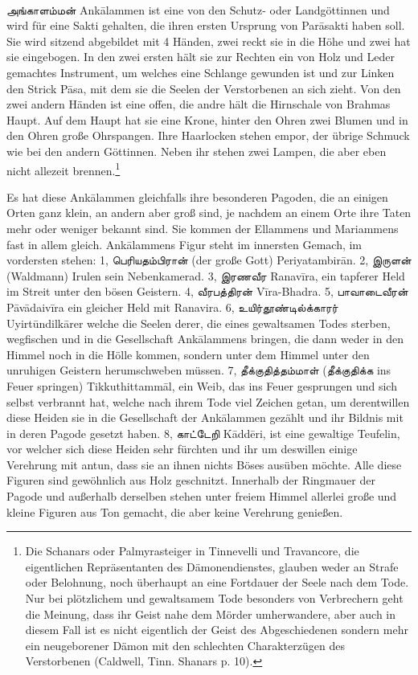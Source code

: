 \documentclass{article}
\newcommand{\TamilText}[1]{\texttamil{#1}}
\newcommand{\tam}[1]{\TamilText{#1}}
\begin{document}
\paragraph{}
\tam{அங்காளம்மன்} Ank\={a}lammen ist eine von den Schutz- oder Landgöttinnen und wird für eine Sakti gehalten, die ihren ersten Ursprung von Par\={a}sakti haben soll. Sie wird sitzend abgebildet mit 4 Händen, zwei reckt sie in die Höhe und zwei hat sie eingebogen. In den zwei ersten hält sie zur Rechten ein von Holz und Leder gemachtes Instrument, um welches eine Schlange gewunden ist und zur Linken den Strick P\={a}sa, mit dem sie die Seelen der Verstorbenen an sich zieht. Von den zwei andern Händen ist eine offen, die andre hält die Hirnschale von Brahmas Haupt. Auf dem Haupt hat sie eine Krone, hinter den Ohren zwei Blumen und in den Ohren große Ohrspangen. Ihre Haarlocken stehen empor, der übrige Schmuck wie bei den andern Göttinnen. Neben ihr stehen zwei Lampen, die aber eben nicht allezeit brennen.\footnote{Die Schanars oder Palmyrasteiger in Tinnevelli und Travancore, die eigentlichen Repräsentanten des Dämonendienstes, glauben weder an Strafe oder Belohnung, noch überhaupt an eine Fortdauer der Seele nach dem Tode. Nur bei plötzlichem und gewaltsamem Tode besonders von Verbrechern geht die Meinung, dass ihr Geist nahe dem Mörder umherwandere, aber auch in diesem Fall ist es nicht eigentlich der Geist des Abgeschiedenen sondern mehr ein neugeborener Dämon mit den schlechten Charakterzügen des Verstorbenen (Caldwell, Tinn. Shanars p. 10).}

Es hat diese Ank\={a}lammen gleichfalls ihre besonderen Pagoden, die an einigen Orten ganz klein, an andern aber groß sind, je nachdem an einem Orte ihre Taten mehr oder weniger bekannt sind. Sie kommen der Ellammens und Mariammens fast in allem gleich. Ank\={a}lammens Figur steht im innersten Gemach, im vordersten stehen: 1, \tam{பெரியதம்பிரான்} (der große Gott) Periyatambir\={a}n. 2, \tam{இருளன்} (Waldmann) Irulen sein Nebenkamerad. 3, \tam{இரணவீர} Ranav\={i}ra, ein tapferer Held im Streit unter den bösen Geistern. 4, \tam{வீரபத்திரன்} V\={i}ra-Bhadra. 5, \tam{பாவாடைவீரன்} P\={a}v\={a}daiv\={i}ra ein gleicher Held mit Ranavira. 6, \tam{உயிர்தூண்டில்க்காரர்} Uyirt\={u}ndilk\={a}rer welche die Seelen derer, die eines gewaltsamen Todes sterben, wegfischen und in die Gesellschaft Ank\={a}lammens bringen, die dann weder in den Himmel noch in die Hölle kommen, sondern unter dem Himmel unter den unruhigen Geistern herumschweben müssen. 7, \tam{தீக்குதித்தம்மாள்} (\tam{தீக்குதிக்க} ins Feuer springen) Tikkuthittamm\={a}l, ein Weib, das ins Feuer gesprungen und sich selbst verbrannt hat, welche nach ihrem Tode viel Zeichen getan, um derentwillen diese Heiden sie in die Gesellschaft der Ank\={a}lammen gezählt und ihr Bildnis mit in deren Pagode gesetzt haben. 8, \tam{காட்டேறி} K\={a}dd\={e}ri, ist eine gewaltige Teufelin, vor welcher sich diese Heiden sehr fürchten und ihr um deswillen einige Verehrung mit antun, dass sie an ihnen nichts Böses ausüben möchte. Alle diese Figuren sind gewöhnlich aus Holz geschnitzt. Innerhalb der Ringmauer der Pagode und außerhalb derselben stehen unter freiem Himmel allerlei große und kleine Figuren aus Ton gemacht, die aber keine Verehrung genießen.
\end{document}
